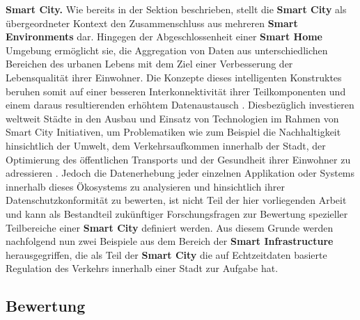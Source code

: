 
\noindent \textbf{Smart City.}
Wie bereits in der Sektion  beschrieben, stellt die \textbf{Smart City} als übergeordneter Kontext den Zusammenschluss aus mehreren \textbf{Smart Environments} dar. Hingegen der Abgeschlossenheit einer \textbf{Smart Home} Umgebung ermöglicht sie, die Aggregation von Daten aus unterschiedlichen Bereichen des urbanen Lebens mit dem Ziel einer Verbesserung der Lebensqualität ihrer Einwohner. Die Konzepte dieses intelligenten Konstruktes beruhen somit auf einer besseren Interkonnektivität ihrer Teilkomponenten und einem daraus resultierenden erhöhtem Datenaustausch \cite{Stefanouli2019}. Diesbezüglich investieren weltweit Städte in den Ausbau und Einsatz von Technologien im Rahmen von Smart City Initiativen, um Problematiken wie zum Beispiel die Nachhaltigkeit hinsichtlich der Umwelt, dem Verkehrsaufkommen innerhalb der Stadt, der Optimierung des öffentlichen Transports und der Gesundheit ihrer Einwohner zu adressieren \cite{BCG2020}.
Jedoch die Datenerhebung jeder einzelnen Applikation oder Systems innerhalb dieses Ökosystems zu analysieren und hinsichtlich ihrer Datenschutzkonformität zu bewerten, ist nicht Teil der hier vorliegenden Arbeit und kann als Bestandteil zukünftiger Forschungsfragen zur Bewertung spezieller Teilbereiche einer \textbf{Smart City} definiert werden. Aus diesem Grunde werden nachfolgend nun zwei Beispiele aus dem Bereich der \textbf{Smart Infrastructure} herausgegriffen, die als Teil der \textbf{Smart City} die auf Echtzeitdaten basierte Regulation des Verkehrs innerhalb einer Stadt zur Aufgabe hat.
 



\subsection{Bewertung}
\label{sec:Hauptteil:ssec:Bewertung}


